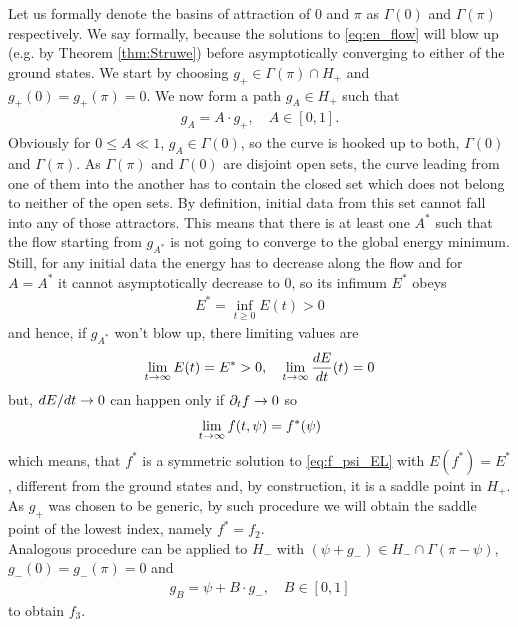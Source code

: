 Let us formally denote the basins of attraction of $0$ and $\pi$ as
$\Gamma(0)$ and $\Gamma(\pi)$ respectively. We say formally, because
the solutions to \eqref{eq:en_flow} will blow up (e.g. by Theorem
\ref{thm:Struwe}) before asymptotically converging to either of the
ground states. We start by choosing $g_+\in\Gamma(\pi)\cap H_+$ and
$g_+(0)=g_+(\pi)=0$. We now form a path $g_A\in H_+$ such that
\begin{align}
  \label{eq:93}
  g_A=A\cdot g_+,\quad A\in[0,1].
\end{align}
Obviously for $0\le A\ll1$, $g_A\in \Gamma(0)$, so the curve is hooked
up to both, $\Gamma(0)$ and $\Gamma(\pi)$. As $\Gamma(\pi)$ and
$\Gamma(0)$ are disjoint open sets, the curve leading from one of them
into the another has to contain the closed set which does not belong
to neither of the open sets. By definition, initial data from this set
cannot fall into any of those attractors. This means that there is at
least one $A^*$ such that the flow starting from $g_{A^*}$ is not
going to converge to the global energy minimum. Still, for any initial
data the energy has to decrease along the flow and for $A=A^*$ it
cannot asymptotically decrease to $0$, so its infimum $E^*$ obeys
\begin{align}\label{eq:94}
  E^*=\inf_{t\ge0} E(t)>0
\end{align}
and hence, if $g_{A^*}$ won't blow up, there limiting values are
\begin{align}\label{eq:95}
  \lim_{t\rightarrow\infty}E(t)=E^*>0,\quad \lim_{t\rightarrow\infty}\frac{dE}{dt}(t)=0
\end{align}
but, $dE/dt\rightarrow0$ can happen only if $\partial_t f\rightarrow0$ so
\begin{align}\label{eq:96}
  \lim_{t\rightarrow\infty}f(t,\psi)=f^*(\psi)
\end{align}
which means, that $f^*$ is a symmetric solution to
\eqref{eq:f_psi_EL} with $E(f^*)=E^*$, different from the ground
states and, by construction, it is a saddle point in $H_+$. As $g_+$
was chosen to be generic, by such procedure we will obtain the saddle
point of the lowest index, namely $f^*=f_2$.\\

Analogous procedure can be applied to $H_-$ with $(\psi+g_-)\in
H_-\cap\Gamma(\pi-\psi)$, $g_-(0)=g_-(\pi)=0$ and
\begin{align}
  \label{eq:97}
  g_B=\psi+B\cdot g_-,\quad B\in[0,1]
\end{align}
to obtain $f_3$.\\




